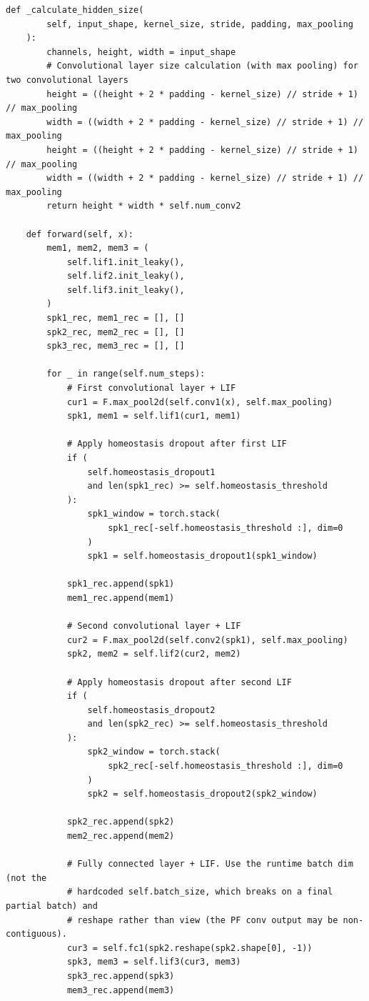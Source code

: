 \begin{lstlisting}[caption={mnn\_torch/models.py},label={lst:mnn-src-models}]
    def _calculate_hidden_size(
        self, input_shape, kernel_size, stride, padding, max_pooling
    ):
        channels, height, width = input_shape
        # Convolutional layer size calculation (with max pooling) for two convolutional layers
        height = ((height + 2 * padding - kernel_size) // stride + 1) // max_pooling
        width = ((width + 2 * padding - kernel_size) // stride + 1) // max_pooling
        height = ((height + 2 * padding - kernel_size) // stride + 1) // max_pooling
        width = ((width + 2 * padding - kernel_size) // stride + 1) // max_pooling
        return height * width * self.num_conv2

    def forward(self, x):
        mem1, mem2, mem3 = (
            self.lif1.init_leaky(),
            self.lif2.init_leaky(),
            self.lif3.init_leaky(),
        )
        spk1_rec, mem1_rec = [], []
        spk2_rec, mem2_rec = [], []
        spk3_rec, mem3_rec = [], []

        for _ in range(self.num_steps):
            # First convolutional layer + LIF
            cur1 = F.max_pool2d(self.conv1(x), self.max_pooling)
            spk1, mem1 = self.lif1(cur1, mem1)

            # Apply homeostasis dropout after first LIF
            if (
                self.homeostasis_dropout1
                and len(spk1_rec) >= self.homeostasis_threshold
            ):
                spk1_window = torch.stack(
                    spk1_rec[-self.homeostasis_threshold :], dim=0
                )
                spk1 = self.homeostasis_dropout1(spk1_window)

            spk1_rec.append(spk1)
            mem1_rec.append(mem1)

            # Second convolutional layer + LIF
            cur2 = F.max_pool2d(self.conv2(spk1), self.max_pooling)
            spk2, mem2 = self.lif2(cur2, mem2)

            # Apply homeostasis dropout after second LIF
            if (
                self.homeostasis_dropout2
                and len(spk2_rec) >= self.homeostasis_threshold
            ):
                spk2_window = torch.stack(
                    spk2_rec[-self.homeostasis_threshold :], dim=0
                )
                spk2 = self.homeostasis_dropout2(spk2_window)

            spk2_rec.append(spk2)
            mem2_rec.append(mem2)

            # Fully connected layer + LIF. Use the runtime batch dim (not the
            # hardcoded self.batch_size, which breaks on a final partial batch) and
            # reshape rather than view (the PF conv output may be non-contiguous).
            cur3 = self.fc1(spk2.reshape(spk2.shape[0], -1))
            spk3, mem3 = self.lif3(cur3, mem3)
            spk3_rec.append(spk3)
            mem3_rec.append(mem3)


\end{lstlisting}
